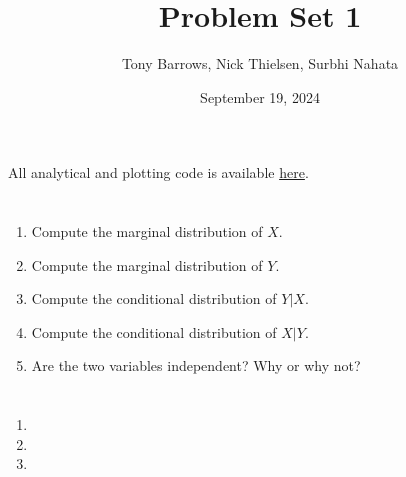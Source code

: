 \documentclass{article}
\title{Problem Set 1}
\author{Tony Barrows, Nick Thielsen, Surbhi Nahata}
\date{September 19, 2024}
\begin{document}
\maketitle

All analytical and plotting code is available \href{https://github.com/ajbarrows/uvmbayes/blob/main/notebooks/problem_sets/20240912-problem_set_1_AJB.ipynb}{here}.
\section{}
\begin{enumerate}
    \item{Compute the marginal distribution of $X$.}\\
        
    \item{Compute the marginal distribution of $Y$.}
        
    \item{Compute the conditional distribution of $Y|X$.}
        
    \item{Compute the conditional distribution of $X|Y$.}
        
    \item{Are the two variables independent? Why or why not?}
        
\end{enumerate}

\section{}
\subsection{}
    
\subsection{}
    
\subsection{}
    

\section{}
    

\section{}
\begin{enumerate}
    \item 
        
    \item 
        
    \item
        
\end{enumerate}
\end{document}
